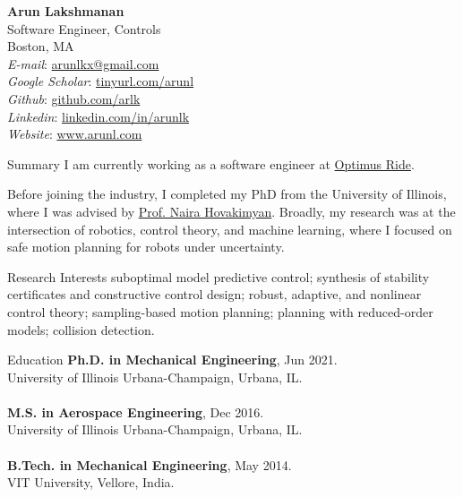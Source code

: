 \documentclass[9pt]{article}
\begin{document}
\begin{rsection}{}
\textbf{\large Arun Lakshmanan} \\
Software Engineer, Controls \\
Boston, MA 
\vspace{0.5em} \\
\textit{E-mail}: \href{mailto:arunlkx@gmail.com}{arunlkx@gmail.com} \\
\textit{Google Scholar}: \href{https://tinyurl.com/arunl}{tinyurl.com/arunl} \\
\textit{Github}: \href{https://github.com/arlk}{github.com/arlk} \\
\textit{Linkedin}: \href{https://www.linkedin.com/in/arunlk/}{linkedin.com/in/arunlk} \\
\textit{Website}: \href{https://www.arunl.com}{www.arunl.com} 
\end{rsection}

\begin{rsection}{Summary}
I am currently working as a software engineer at \href{https://optimusride.com}{Optimus Ride}. 

Before joining the industry, I completed my PhD from the University of Illinois, where I was advised by \href{https://naira-hovakimyan.mechse.illinois.edu/}{Prof. Naira Hovakimyan}. Broadly, my research was at the intersection of robotics, control theory, and machine learning, where I focused on safe motion planning for robots under uncertainty. 
\end{rsection}

\begin{rsection}{Research Interests}
suboptimal model predictive control; synthesis of stability certificates and constructive control design; robust, adaptive, and nonlinear control theory; sampling-based motion planning; planning with reduced-order models; collision detection.
\end{rsection}

\begin{rsection}{Education}
    \textbf{Ph.D. in Mechanical Engineering}, Jun 2021. \\
    University of Illinois Urbana-Champaign, Urbana, IL. \\ \\
    \textbf{M.S. in Aerospace Engineering}, Dec 2016. \\
    University of Illinois Urbana-Champaign, Urbana, IL. \\ \\
    \textbf{B.Tech. in Mechanical Engineering}, May 2014. \\
    VIT University, Vellore, India.
\end{rsection}
\end{document}
